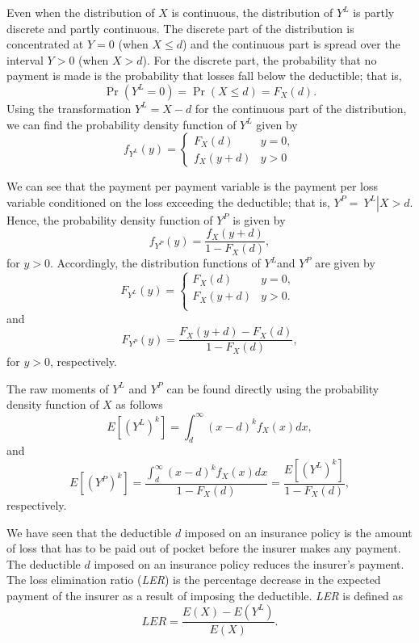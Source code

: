 \documentclass[]{book}
\begin{document}
Even when the distribution of \(X\) is continuous, the distribution of
\(Y^{L}\) is partly discrete and partly continuous. The discrete part of
the distribution is concentrated at \(Y = 0\) (when \(X \leq d\)) and
the continuous part is spread over the interval \(Y > 0\) (when
\(X > d\)). For the discrete part, the probability that no payment is
made is the probability that losses fall below the deductible; that is,
\[\Pr\left( Y^{L} = 0 \right) = \Pr\left( X \leq d \right) = F_{X}\left( d \right).\]
Using the transformation \(Y^{L} = X - d\) for the continuous part of
the distribution, we can find the probability density function of
\(Y^{L}\) given by \[f_{Y^{L}}\left( y \right) = \left\{ \begin{matrix}
F_{X}\left( d \right) & y = 0, \\
f_{X}\left( y + d \right) & y > 0 
\end{matrix} \right. \]

We can see that the payment per payment variable is the payment per loss
variable conditioned on the loss exceeding the deductible; that is,
\(Y^{P} = \left. \ Y^{L} \right|X > d\). Hence, the probability density
function of \(Y^{P}\) is given by
\[f_{Y^{P}}\left( y \right) = \frac{f_{X}\left( y + d \right)}{1 - F_{X}\left( d \right)},\]
for \(y > 0\). Accordingly, the distribution functions of \(Y^{L}\)and
\(Y^{P}\) are given by
\[F_{Y^{L}}\left( y \right) = \left\{ \begin{matrix}
F_{X}\left( d \right) & y = 0, \\
F_{X}\left( y + d \right) & y > 0. \\
\end{matrix} \right.\ \] and
\[F_{Y^{P}}\left( y \right) = \frac{F_{X}\left( y + d \right) - F_{X}\left( d \right)}{1 - F_{X}\left( d \right)},\]
for \(y > 0\), respectively.

The raw moments of \(Y^{L}\) and \(Y^{P}\) can be found directly using
the probability density function of \(X\) as follows
\[E\left\lbrack \left( Y^{L} \right)^{k} \right\rbrack = \int_{d}^{\infty}\left( x - d \right)^{k}f_{X}\left( x \right)dx ,\]
and
\[E\left\lbrack \left( Y^{P} \right)^{k} \right\rbrack = \frac{\int_{d}^{\infty}\left( x - d \right)^{k}f_{X}\left( x \right) dx }{{1 - F}_{X}\left( d \right)} = \frac{E\left\lbrack \left( Y^{L} \right)^{k} \right\rbrack}{{1 - F}_{X}\left( d \right)},\]
respectively.

We have seen that the deductible \(d\) imposed on an insurance policy is
the amount of loss that has to be paid out of pocket before the insurer
makes any payment. The deductible \(d\) imposed on an insurance policy
reduces the insurer's payment. The loss elimination ratio (\emph{LER})
is the percentage decrease in the expected payment of the insurer as a
result of imposing the deductible. \emph{LER} is defined as
\[LER = \frac{E\left( X \right) - E\left( Y^{L} \right)}{E\left( X \right)}.\]
\end{document}
